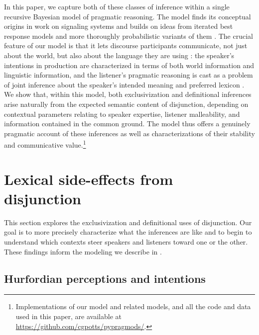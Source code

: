 \documentclass{article}
\begin{document}
In this paper, we capture both of these classes of inference within a
single recursive Bayesian model of pragmatic reasoning. The model
finds its conceptual origins in  work on signaling
systems and builds on ideas from iterated best response models
\citep{Jaeger:2007,Jaeger:2011,Franke09DISS} and more thoroughly
probabilistic variants of them
\citep{CamererHo:2004,Frank:Goodman:2012}. The crucial feature of our
model is that it lets discourse participants communicate, not just
about the world, but also about the language they are using
\citep{Bergen:Goodman:Levy:2012,bergen-levy-goodman:2014}: the
speaker's intentions in production are characterized in terms of both
world information and linguistic information, and the listener's
pragmatic reasoning is cast as a problem of joint inference about the
speaker's intended meaning and preferred lexicon
\citep{Smith:Goodman:Frank:2013}. We show that, within this model,
both exclusivization and definitional inferences arise naturally from
the expected semantic content of disjunction, depending on contextual
parameters relating to speaker expertise, listener malleability, and
information contained in the common ground. The model thus offers a
genuinely pragmatic account of these inferences as well as
characterizations of their stability and communicative
value.\footnote{Implementations of our model and related models, and
  all the code and data used in this paper, are available at
  \url{https://github.com/cgpotts/pypragmods/}.}


\section{Lexical side-effects from disjunction}\label{sec:data}

This section explores the exclusivization and definitional uses of
disjunction. Our goal is to more precisely characterize what the
inferences are like and to begin to understand which contexts steer
speakers and listeners toward one or the other. These findings inform
the modeling we describe in .


\subsection{Hurfordian perceptions and intentions}\label{sec:data:overlapping}
\end{document}
